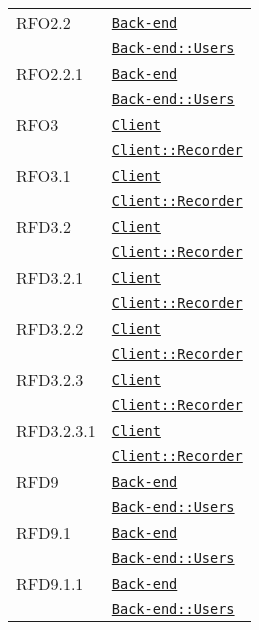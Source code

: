 \begin{longtable}{|>{\centering}m{3cm}|m{10cm}<{\centering}|}
RFO2.2 & \hyperref[Back-end]{\texttt{Back-end}}\\
& \hyperref[Back-end::Users]{\texttt{Back-end::Users}}\\ \hline

RFO2.2.1 & \hyperref[Back-end]{\texttt{Back-end}}\\
& \hyperref[Back-end::Users]{\texttt{Back-end::Users}}\\ \hline

RFO3 & \hyperref[Client]{\texttt{Client}}\\
& \hyperref[Client::Recorder]{\texttt{Client::Recorder}}\\ \hline

RFO3.1 & \hyperref[Client]{\texttt{Client}}\\
& \hyperref[Client::Recorder]{\texttt{Client::Recorder}}\\ \hline

RFD3.2 & \hyperref[Client]{\texttt{Client}}\\
& \hyperref[Client::Recorder]{\texttt{Client::Recorder}}\\ \hline

RFD3.2.1 & \hyperref[Client]{\texttt{Client}}\\
& \hyperref[Client::Recorder]{\texttt{Client::Recorder}}\\ \hline

RFD3.2.2 & \hyperref[Client]{\texttt{Client}}\\
& \hyperref[Client::Recorder]{\texttt{Client::Recorder}}\\ \hline

RFD3.2.3 & \hyperref[Client]{\texttt{Client}}\\
& \hyperref[Client::Recorder]{\texttt{Client::Recorder}}\\ \hline

RFD3.2.3.1 & \hyperref[Client]{\texttt{Client}}\\
& \hyperref[Client::Recorder]{\texttt{Client::Recorder}}\\ \hline

RFD9 & \hyperref[Back-end]{\texttt{Back-end}}\\
& \hyperref[Back-end::Users]{\texttt{Back-end::Users}}\\ \hline

RFD9.1 & \hyperref[Back-end]{\texttt{Back-end}}\\
& \hyperref[Back-end::Users]{\texttt{Back-end::Users}}\\ \hline

RFD9.1.1 & \hyperref[Back-end]{\texttt{Back-end}}\\
& \hyperref[Back-end::Users]{\texttt{Back-end::Users}}\\ \hline


\end{longtable}
